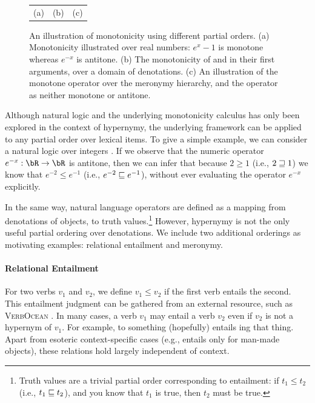 \begin{figure}
\begin{center}
\begin{tabular}{ccc}
(a) & (b) & (c)
\end{tabular}
\end{center}
\caption{
An illustration of monotonicity using different partial orders.
(a) Monotonicity illustrated over real numbers: $e^x-1$ is monotone whereas
    $e^{-x}$ is antitone.
(b) The monotonicity of  and  in their first arguments, over
    a domain of denotations.
(c) An illustration of the  monotone operator over the meronymy hierarchy,
    and the operator  as neither monotone or antitone.
}
\end{figure}

Although natural logic and the underlying monotonicity calculus has 
  only been explored in the context of hypernymy, the underlying framework
  can be applied to any partial order over lexical items.
To give a simple example, 
  we can consider a natural logic over integers \cite{key:2014icard-natlog}.
If we observe that the numeric operator $e^{-x} : \bR \rightarrow \bR$ is
  antitone, then we can infer that because $2 \geq 1$ (i.e., $2 \sqsupseteq 1$)
  we know that $e^{-2} \leq e^{-1}$ (i.e., $e^{-2} \sqsubseteq e^{-1}$), without
  ever evaluating the operator $e^{-x}$ explicitly.

In the same way, natural language operators are defined as a mapping from
  denotations of objects, to truth values.\footnote{
  Truth values are a trivial partial order corresponding to entailment:
  if \hbox{$t_1 \leq t_2$} 
  (i.e., \hbox{$t_1 \sqsubseteq t_2$}),
  and you know that $t_1$ is true, then $t_2$ must be true.
}
However, hypernymy is not the only useful partial ordering over denotations.
We include two additional orderings as motivating examples: relational
  entailment and meronymy.

\paragraph{Relational Entailment}
For two verbs $v_1$ and $v_2$, we define $v_1 \leq v_2$ if the first verb
  entails the second.
This entailment judgment can be gathered from an external resource, such as
  \textsc{VerbOcean} \cite{key:2004chklovski-verbocean}.
In many cases, a verb $v_1$ may entail a verb $v_2$ even if $v_2$ is not a hypernym of $v_1$.
For example, to  something (hopefully) entails ing that thing.
Apart from esoteric context-specific cases (e.g.,  entails  only
  for man-made objects), these relations hold largely independent of context.

